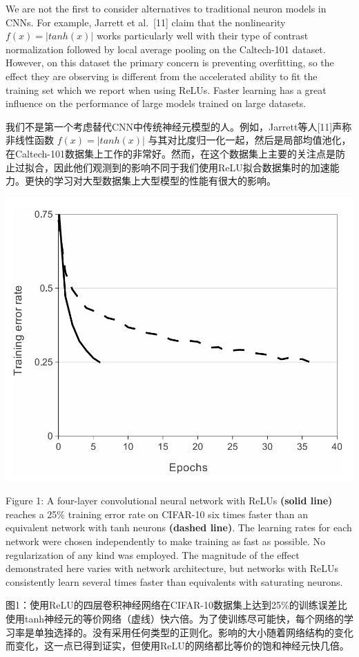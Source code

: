 \documentclass[12pt,a4paper,UTF8,twoside]{book}
\begin{document}
We are not the first to consider alternatives to traditional neuron models in CNNs. For example, Jarrett et al.~{[}11{]} claim that the nonlinearity \(f(x) = |tanh(x)|\) works particularly well with their type of contrast normalization followed by local average pooling on the Caltech-101 dataset. However, on this dataset the primary concern is preventing overfitting, so the effect they are observing is different from the accelerated ability to fit the training set which we report when using ReLUs. Faster learning has a great influence on the performance of large models trained on large datasets.

我们不是第一个考虑替代CNN中传统神经元模型的人。例如，Jarrett等人{[}11{]}声称非线性函数 \(f(x) = |tanh(x)|\) 与其对比度归一化一起，然后是局部均值池化，在Caltech-101数据集上工作的非常好。然而，在这个数据集上主要的关注点是防止过拟合，因此他们观测到的影响不同于我们使用ReLU拟合数据集时的加速能力。更快的学习对大型数据集上大型模型的性能有很大的影响。

\begin{center}\includegraphics[width=0.7\linewidth]{img/01-01} \end{center}

Figure 1: A four-layer convolutional neural network with ReLUs \textbf{(solid line)} reaches a 25\% training error rate on CIFAR-10 six times faster than an equivalent network with tanh neurons \textbf{(dashed line)}. The learning rates for each network were chosen independently to make training as fast as possible. No regularization of any kind was employed. The magnitude of the effect demonstrated here varies with network architecture, but networks with ReLUs consistently learn several times faster than equivalents with saturating neurons.

图1：使用ReLU的四层卷积神经网络在CIFAR-10数据集上达到25\%的训练误差比使用tanh神经元的等价网络（虚线）快六倍。为了使训练尽可能快，每个网络的学习率是单独选择的。没有采用任何类型的正则化。影响的大小随着网络结构的变化而变化，这一点已得到证实，但使用ReLU的网络都比等价的饱和神经元快几倍。
\end{document}

